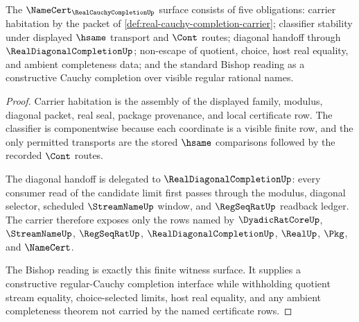 \begin{theorem}
\label{thm:real-cauchy-completion-namecert-obligations}
The $\NameCert_{\RealCauchyCompletionUp}$ surface consists of five obligations: carrier habitation by the packet of \autoref{def:real-cauchy-completion-carrier}; classifier stability under displayed $\hsame$ transport and $\Cont$ routes; diagonal handoff through $\RealDiagonalCompletionUp$; non-escape of quotient, choice, host real equality, and ambient completeness data; and the standard Bishop reading as a constructive Cauchy completion over visible regular rational names.
\end{theorem}
\begin{proof}
Carrier habitation is the assembly of the displayed family, modulus, diagonal packet, real seal, package provenance, and local certificate row. The classifier is componentwise because each coordinate is a visible finite row, and the only permitted transports are the stored $\hsame$ comparisons followed by the recorded $\Cont$ routes.

The diagonal handoff is delegated to $\RealDiagonalCompletionUp$: every consumer read of the candidate limit first passes through the modulus, diagonal selector, scheduled $\StreamNameUp$ window, and $\RegSeqRatUp$ readback ledger. The carrier therefore exposes only the rows named by $\DyadicRatCoreUp$, $\StreamNameUp$, $\RegSeqRatUp$, $\RealDiagonalCompletionUp$, $\RealUp$, $\Pkg$, and $\NameCert$.

The Bishop reading is exactly this finite witness surface. It supplies a constructive regular-Cauchy completion interface while withholding quotient stream equality, choice-selected limits, host real equality, and any ambient completeness theorem not carried by the named certificate rows.
\end{proof}

